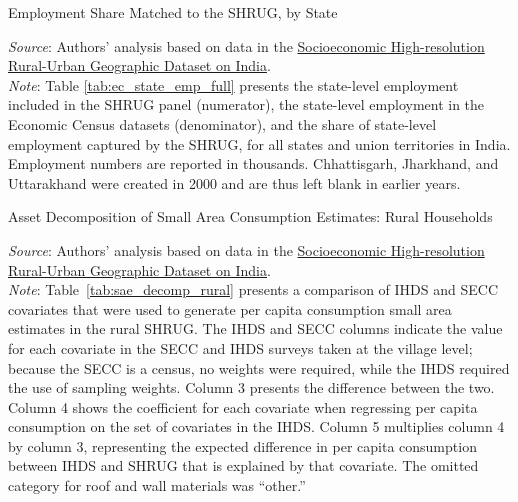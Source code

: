\documentclass[12pt,letterpaper]{article}
\begin{document}
\begin{appendix}
  \begin{table}[H]
    \caption{Employment Share Matched to the SHRUG, by State} 
    \vspace{-5mm}

  \begin{center}
    \tiny{}
  \end{center}
    
  \footnotesize \textit{Source}: Authors' analysis based on data in the \href{http://www.devdatalab.org/shrug}{Socioeconomic High-resolution
    Rural-Urban Geographic Dataset on India}.\\
  \footnotesize \textit{Note}: Table \ref{tab:ec_state_emp_full} presents
  the state-level employment included in the SHRUG panel
  (numerator), the state-level employment in the Economic Census
  datasets (denominator), and the share of state-level employment
  captured by the SHRUG, for all states and union territories in
  India. Employment numbers are reported in
  thousands. Chhattisgarh, Jharkhand, and Uttarakhand were
  created in 2000 and are thus left blank in earlier years.

  \label{tab:ec_state_emp_full}
  \end{table}

\begin{center}
  \begin{table}[H]
    \caption{Asset Decomposition of Small Area Consumption Estimates: \cnewline Rural Households} 
  \begin{center}
    \scriptsize{}
  \end{center}
    \scriptsize \textit{Source}: Authors' analysis based on data in the \href{http://www.devdatalab.org/shrug}{Socioeconomic High-resolution
      Rural-Urban Geographic Dataset on India}. \\
    \scriptsize \textit{Note}: Table~\ref{tab:sae_decomp_rural} presents a
    comparison of IHDS and SECC covariates that were used to generate
    per capita consumption small area estimates in the rural
    SHRUG. The IHDS and SECC columns indicate the value for each
    covariate in the SECC and IHDS surveys taken at the village level;
    because the SECC is a census, no weights were required, while the
    IHDS required the use of sampling weights. Column 3 presents the
    difference between the two. Column 4 shows the coefficient for
    each covariate when regressing per capita consumption on the set
    of covariates in the IHDS. Column 5 multiplies column 4 by column
    3, representing the expected difference in per capita consumption
    between IHDS and SHRUG that is explained by that covariate. The
    omitted category for roof and wall materials was ``other.''
    

\end{table}
\end{center}
\end{appendix}
\end{document}
